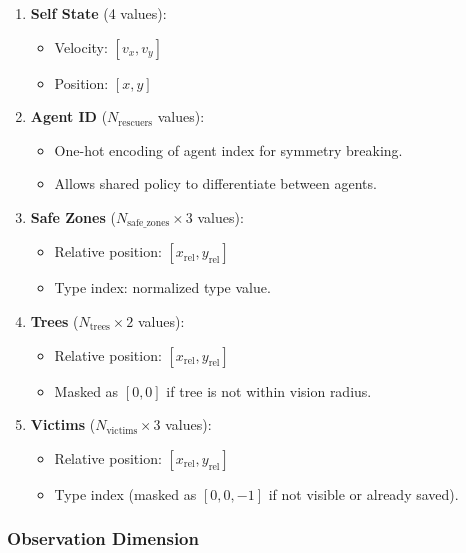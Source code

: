 \documentclass[11pt,a4paper]{article}
\begin{document}
\begin{enumerate}
    \item \textbf{Self State} (4 values):
    \begin{itemize}
        \item Velocity: $[v_x, v_y]$
        \item Position: $[x, y]$
    \end{itemize}

    \item \textbf{Agent ID} ($N_{\text{rescuers}}$ values):
    \begin{itemize}
        \item One-hot encoding of agent index for symmetry breaking.
        \item Allows shared policy to differentiate between agents.
    \end{itemize}

    \item \textbf{Safe Zones} ($N_{\text{safe\_zones}} \times 3$ values):
    \begin{itemize}
        \item Relative position: $[x_{\text{rel}}, y_{\text{rel}}]$
        \item Type index: normalized type value.
    \end{itemize}

    \item \textbf{Trees} ($N_{\text{trees}} \times 2$ values):
    \begin{itemize}
        \item Relative position: $[x_{\text{rel}}, y_{\text{rel}}]$
        \item Masked as $[0, 0]$ if tree is not within vision radius.
    \end{itemize}

    \item \textbf{Victims} ($N_{\text{victims}} \times 3$ values):
    \begin{itemize}
        \item Relative position: $[x_{\text{rel}}, y_{\text{rel}}]$
        \item Type index (masked as $[0, 0, -1]$ if not visible or already saved).
    \end{itemize}
\end{enumerate}

\subsubsection{Observation Dimension}
\label{subsubsec:obs_dimension}
\end{document}
